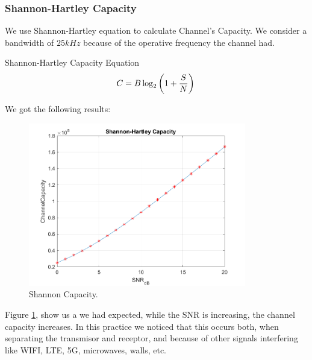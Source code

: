 \subsubsection{Shannon-Hartley Capacity}
We use Shannon-Hartley equation to calculate Channel's Capacity. We consider a bandwidth of $25 kHz$ because of  the operative frequency the channel had. %

Shannon-Hartley Capacity Equation
\begin{equation}
	C = B\log_{2}\left(1+\frac{S}{N}\right)\\
\end{equation}

We got the following results:

\begin{figure}[!htbp]
	\centering
	\includegraphics[width=9.5cm]{images/shannon_capacity.png}
	\caption{Shannon Capacity.}
	\label{fig:shannon}
\end{figure}

Figure \ref{fig:shannon}, show us a we had expected, while the SNR is increasing, the channel capacity increases. 
In this practice we noticed that this occurs both, when separating the transmisor and receptor, and because  of  other signals interfering like WIFI, LTE, 5G, microwaves, walls, etc. 
